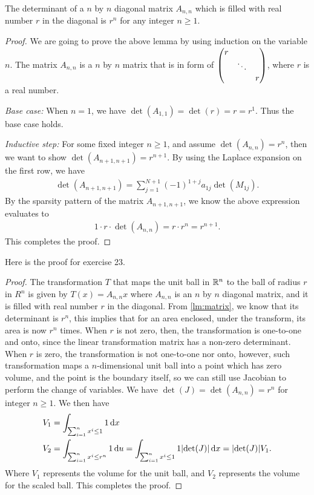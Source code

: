 \documentclass[8pt]{article}
\begin{document}
\begin{Answer}[number=23]
  \begin{lemma}\label{lm:matrix}
    The determinant of a $n$ by $n$ diagonal matrix $A_{n,n}$ which is filled with
    real number $r$ in the diagonal is $r^n$ for any integer $n\ge 1$.
  \end{lemma}
  \begin{proof}
    We are going to prove the above lemma by using induction on the variable
    $n$. The matrix $A_{n,n}$ is a $n$ by $n$ matrix that is in form of
    $\mqty(\dmat{r,\ddots,r})$, where $r$ is a real number.

    \emph{Base case:} When $n=1$, we have $\det(A_{1,1}) = \det(r) = r = r^1$. Thus
    the base case holds.

    \emph{Inductive step:} For some fixed integer $n\ge 1$, and assume
    $\det(A_{n,n}) = r^n$, then we want to show $\det(A_{n+1,n+1}) = r^{n+1}$.
    By using the Laplace expansion on the first row, we have
    \begin{align*}
      \det(A_{n+1,n+1}) = \sum_{j=1}^{N+1}(-1)^{1+j}a_{1j}\det(M_{1j}).
    \end{align*}
    By the sparsity pattern of the matrix $A_{n+1,n+1}$, we know the above
    expression evaluates to
    \begin{align*}
      1\cdot r\cdot \det(A_{n,n}) = r\cdot r^n = r^{n+1}.
    \end{align*}
    This completes the proof.
  \end{proof}
  Here is the proof for exercise 23.
  \begin{proof}
    The transformation $T$ that maps the unit ball in $\mathbb{R}^n$ to the ball of
    radius $r$ in $R^n$ is given by
    \(
      T(x) = A_{n,n} x
    \)
    where $A_{n,n}$ is an $n$ by $n$ diagonal matrix, and it is filled with
    real number $r$ in the diagonal. From \cref{lm:matrix}, we know that its
    determinant is $r^n$, this implies that for an area enclosed, under the
    transform, its area is now $r^n$ times. When $r$ is not zero, then, the
    transformation is one-to-one and onto, since the linear transformation
    matrix has a non-zero determinant. When $r$ is zero, the transformation is
    not one-to-one nor onto, however, such transformation maps a
    $n$-dimensional unit ball into a point which has zero volume, and the point
    is the boundary itself, so we can still use Jacobian to perform the change
    of variables. We have $\det(J) = \det(A_{n,n}) = r^n$ for integer $n\ge 1$.
    We then have
    \begin{align*}
      V_1 &= \int_{\sum_{i=1}^n x^i\le 1} 1 \dd{x} \\
      V_2 &= \int_{\sum_{i=1}^n x^i\le r^n} 1 \dd{u} = \int_{\sum_{i=1}^n x^i\le 1} 1 \abs{\det(J)} \dd{x} = \abs{\det(J)}
      V_1.
    \end{align*}
    Where $V_1$ represents the volume for the unit ball, and $V_2$ represents
    the volume for the scaled ball. This completes the proof.
  \end{proof}
\end{Answer}
\end{document}
